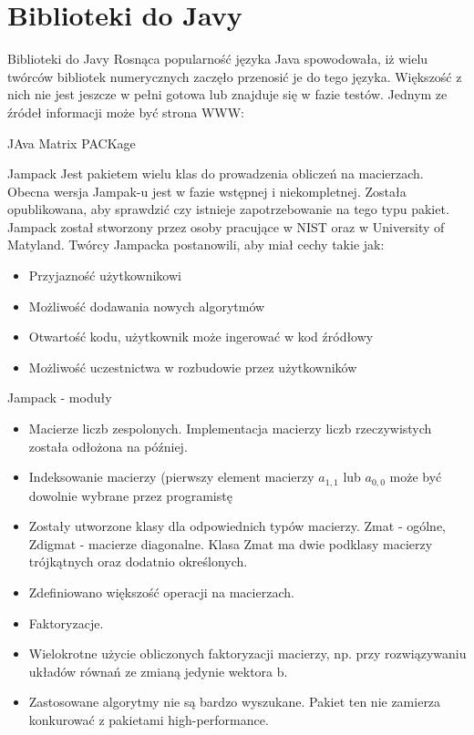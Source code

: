 \section{Biblioteki do Javy}
	\begin{frame}{Biblioteki do Javy}
		Rosnąca popularność języka Java spowodowała, iż wielu twórców bibliotek numerycznych zaczęło przenosić je do tego języka. Większość z nich nie jest jeszcze w pełni gotowa lub znajduje się w fazie testów. Jednym ze źródeł informacji może być strona WWW:
	\end{frame}
	\begin{frame}{JAva Matrix PACKage}
		\begin{block}{Jampack}
			Jest pakietem wielu klas do prowadzenia obliczeń na macierzach. Obecna wersja Jampak-u jest w fazie wstępnej i niekompletnej. Została opublikowana, aby sprawdzić czy istnieje zapotrzebowanie na tego typu pakiet. Jampack został stworzony przez osoby pracujące w NIST oraz w University of Matyland. Twórcy Jampacka postanowili, aby miał cechy takie jak:
			\begin{itemize}
				\item Przyjazność użytkownikowi
				\item Możliwość dodawania nowych algorytmów
				\item Otwartość kodu, użytkownik może ingerować w kod źródłowy
				\item Możliwość uczestnictwa w rozbudowie przez użytkowników\
			\end{itemize}
		\end{block}
	\end{frame}
	\begin{frame}{Jampack - moduły}
		\begin{itemize}
			\item Macierze liczb zespolonych. Implementacja macierzy liczb rzeczywistych została odłożona na później.
			\item Indeksowanie macierzy (pierwszy element macierzy $a_{1,1}$ lub $a_{0,0}$ może być dowolnie wybrane przez programistę
			\item Zostały utworzone klasy dla odpowiednich typów macierzy. Zmat - ogólne, Zdigmat - macierze diagonalne. Klasa Zmat ma dwie podklasy macierzy trójkątnych oraz dodatnio określonych. 
			\item Zdefiniowano większość operacji na macierzach. 
			\item Faktoryzacje.
			\item Wielokrotne użycie obliczonych faktoryzacji macierzy, np. przy rozwiązywaniu układów równań ze zmianą jedynie wektora b.
			\item Zastosowane algorytmy nie są bardzo wyszukane. Pakiet ten nie zamierza konkurować z pakietami high-performance.
		\end{itemize}
		
	\end{frame}

